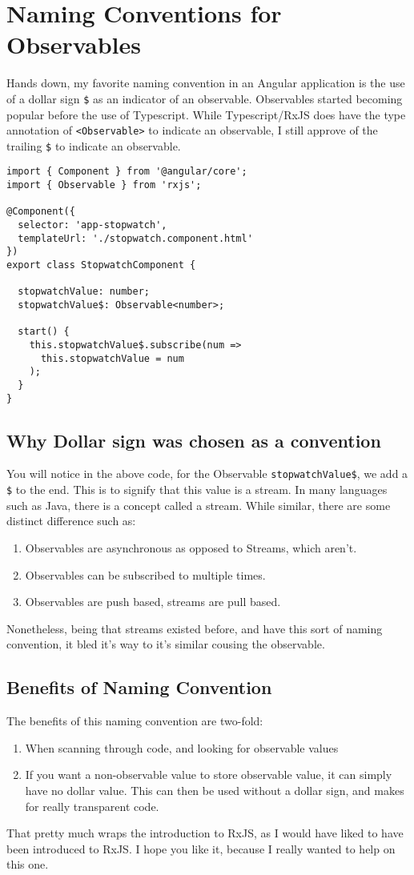 \section{Naming Conventions for Observables}
Hands down, my favorite naming convention in an Angular application is the use of a 
dollar sign \lstinline{$} as an indicator of an observable. Observables started 
becoming popular before the use of Typescript. While Typescript/RxJS does have 
the type annotation of \lstinline{<Observable>} to indicate an observable, I still
approve of the trailing \lstinline{$} to indicate an observable. 

\begin{lstlisting}[caption=Observable Naming Convention]
import { Component } from '@angular/core';
import { Observable } from 'rxjs';

@Component({
  selector: 'app-stopwatch',
  templateUrl: './stopwatch.component.html'
})
export class StopwatchComponent {

  stopwatchValue: number;
  stopwatchValue$: Observable<number>;

  start() {
    this.stopwatchValue$.subscribe(num =>
      this.stopwatchValue = num
    );
  }
}  
\end{lstlisting}

\subsection{Why Dollar sign was chosen as a convention}
You will notice in the above code, for the Observable 
\lstinline{stopwatchValue$}, we add a \lstinline{$} to the end. This is to 
signify that this value is a stream. In many languages such as Java, there is a 
concept called a stream. While similar, there are some distinct difference such 
as: 
\begin{enumerate}
  \item Observables are asynchronous as opposed to Streams, which aren't.
  \item Observables can be subscribed to multiple times. 
  \item Observables are push based, streams are pull based.
\end{enumerate}

Nonetheless, being that streams existed before, and have this sort of naming 
convention, it bled it's way to it's similar cousing the observable. 

\subsection{Benefits of Naming Convention}
The benefits of this naming convention are two-fold: 
\begin{enumerate}
  \item When scanning through code, and looking for observable values
  \item If you want a non-observable value to store observable value, 
  it can simply have no dollar value. This can then be used without a dollar 
  sign, and makes for really transparent code. 
\end{enumerate}

That pretty much wraps the introduction to RxJS, as I would have liked to 
have been introduced to RxJS. I hope you like it, because I really wanted 
to help on this one.